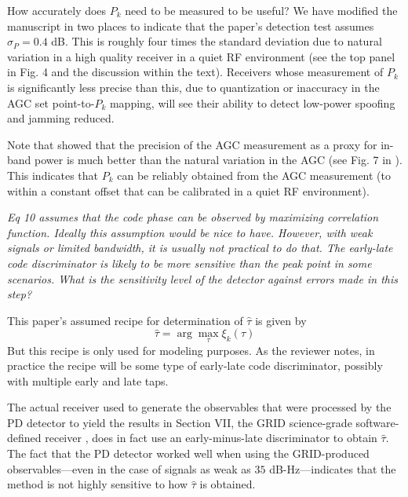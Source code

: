 \documentclass[12pt]{report}
\begin{document}
      How accurately does $P_k$ need to be measured to be useful?  We have
      modified the manuscript in two places to indicate that the paper's
      detection test assumes $\sigma_P = 0.4$ dB.  This is roughly four times
      the standard deviation due to natural variation in a high quality
      receiver in a quiet RF environment (see the top panel in Fig. 4 and the
      discussion within the text).  Receivers whose measurement of $P_k$ is
      significantly less precise than this, due to quantization or inaccuracy
      in the AGC set point-to-$P_k$ mapping, will see their ability to detect
      low-power spoofing and jamming reduced.

      Note that \cite{akos2012s} showed that the precision of the AGC
      measurement as a proxy for in-band power is much better than the natural
      variation in the AGC (see Fig. 7 in \cite{akos2012s}).  This indicates
      that $P_k$ can be reliably obtained from the AGC measurement (to within
      a constant offset that can be calibrated in a quiet RF environment).
  

{\textit{Eq 10 assumes that the code phase can be observed
      by maximizing correlation function. Ideally this
      assumption would be nice to have. However, with weak
      signals or limited bandwidth, it is usually not practical
      to do that. The early-late code discriminator is likely to
      be more sensitive than the peak point in some
      scenarios. What is the sensitivity level of the detector
      against errors made in this step? }}

  
   This paper's assumed recipe for determination of $\hat{\tau}$ is given
    by \[ \hat{\tau} = \arg \max_\tau \xi_k(\tau)  \]  But this recipe is
    only used for modeling purposes.  As the reviewer notes, in practice the
    recipe will be some type of early-late code discriminator, possibly with
    multiple early and late taps.

    The actual receiver used to generate the observables that were processed
    by the PD detector to yield the results in Section VII, the GRID
    science-grade software-defined receiver \cite{lightsey2013demonstration},
    does in fact use an early-minus-late discriminator to obtain $\hat{\tau}$.
    The fact that the PD detector worked well when using the GRID-produced
    observables---even in the case of signals as weak as $35$
    dB-Hz---indicates that the method is not highly sensitive to how
    $\hat{\tau}$ is obtained.
  
 

\end{document}
